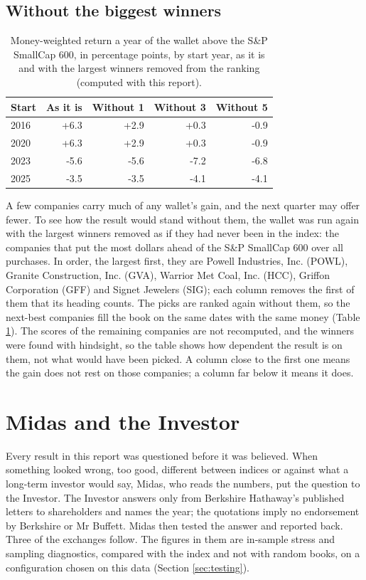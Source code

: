 \documentclass[11pt,a4paper]{article}
\begin{document}
\subsection{Without the biggest winners}
\begin{table}[H]
\centering
\small
\caption{Money-weighted return a year of the wallet above the S\&P SmallCap 600, in percentage points, by start year, as it is and with the largest winners removed from the ranking (computed with this report).}\label{tab:winners}
\begin{tabular}{l r r r r}
\hline
Start & As it is & Without 1 & Without 3 & Without 5 \\
\hline
2016 & +6.3 & +2.9 & +0.3 & -0.9 \\
2020 & +6.3 & +2.9 & +0.3 & -0.9 \\
2023 & -5.6 & -5.6 & -7.2 & -6.8 \\
2025 & -3.5 & -3.5 & -4.1 & -4.1 \\
\hline
\end{tabular}
\end{table}
A few companies carry much of any wallet's gain, and the next quarter may offer fewer. To see how the result would stand without them, the wallet was run again with the largest winners removed as if they had never been in the index: the companies that put the most dollars ahead of the S\&P SmallCap 600 over all purchases. In order, the largest first, they are Powell Industries, Inc. (POWL), Granite Construction, Inc. (GVA), Warrior Met Coal, Inc. (HCC), Griffon Corporation (GFF) and Signet Jewelers (SIG); each column removes the first of them that its heading counts. The picks are ranked again without them, so the next-best companies fill the book on the same dates with the same money (Table \ref{tab:winners}). The scores of the remaining companies are not recomputed, and the winners were found with hindsight, so the table shows how dependent the result is on them, not what would have been picked. A column close to the first one means the gain does not rest on those companies; a column far below it means it does.

\section{Midas and the Investor}
\label{sec:dialogue}
Every result in this report was questioned before it was believed. When something looked wrong, too good, different between indices or against what a long-term investor would say, Midas, who reads the numbers, put the question to the Investor. The Investor answers only from Berkshire Hathaway's published letters to shareholders and names the year; the quotations imply no endorsement by Berkshire or Mr Buffett. Midas then tested the answer and reported back. Three of the exchanges follow. The figures in them are in-sample stress and sampling diagnostics, compared with the index and not with random books, on a configuration chosen on this data (Section \ref{sec:testing}).
\end{document}
